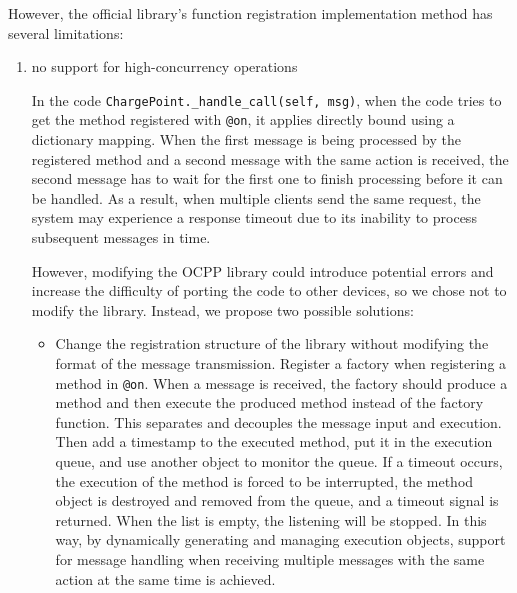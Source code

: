 \documentclass[
	english,
	ruledheaders=section,%
	class=report,%
	thesis={type=Report},%
	accentcolor=9c,%
	custommargins=true,%
	marginpar=false,%
	parskip=half-,%
	fontsize=11pt,%
	logofile={img/tuda_logo.pdf}, %
]{tudapub}
\begin{document}
However, the official library's function registration implementation method has several limitations:
\begin{enumerate}
    \item no support for high-concurrency operations
    
    In the code \texttt{ChargePoint.\_handle\_call(self, msg)}, when the code tries to get the method registered with \texttt{@on}, it applies directly bound using a dictionary mapping. When the first message is being processed by the registered method and a second message with the same action is received, the second message has to wait for the first one to finish processing before it can be handled. As a result, when multiple clients send the same request, the system may experience a response timeout due to its inability to process subsequent messages in time. 
    
    However, modifying the \ac{OCPP} library could introduce potential errors and increase the difficulty of porting the code to other devices, so we chose not to modify the library. Instead, we propose two possible solutions:
    
    \begin{itemize}
        \item %

        Change the registration structure of the library without modifying the format of the message transmission. 
        Register a factory when registering a method in \texttt{@on}. When a message is received, the factory should produce a method and then execute the produced method instead of the factory function. This separates and decouples the message input and execution. Then add a timestamp to the executed method, put it in the execution queue, and use another object to monitor the queue. If a timeout occurs, the execution of the method is forced to be interrupted, the method object is destroyed and removed from the queue, and a timeout signal is returned. When the list is empty, the listening will be stopped. In this way, by dynamically generating and managing execution objects, support for message handling when receiving multiple messages with the same action at the same time is achieved.
        

\end{itemize}
\end{enumerate}
\end{document}
